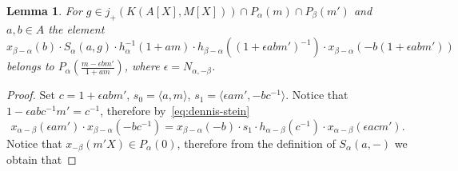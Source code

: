\documentclass[10pt,a4paper,twoside]{article}
\newtheorem{lemma}{Lemma}
\theoremstyle{remark}
\theoremstyle{definition}
\numberwithin{lemma}{section}
\numberwithin{prop}{section}
\numberwithin{corollary}{section}
\numberwithin{externaltheorem}{section}
\numberwithin{equation}{section}
\begin{document}
\begin{lemma} \label{SR:obtuse} For $g \in j_+(K(A[X], M[X])) \cap P_\alpha(m) \cap P_\beta(m')$ and $a, b\in A$ the element \[ x_{\beta - \alpha}(b) \cdot S_\alpha(a, g) \cdot h_{\alpha}^{-1}(1+am)\cdot h_{\beta - \alpha}((1 + \epsilon abm')^{-1})\cdot x_{\beta - \alpha}(-b(1 + \epsilon abm')) \]
 belongs to $P_\alpha\left(\tfrac{m - \epsilon bm'}{1+am}\right)$, where $\epsilon = N_{\alpha, -\beta}$.
\end{lemma}
\begin{proof} Set $c = 1 + \epsilon a b m'$, $s_0 = \langle a, m \rangle$, $s_1 = \langle \epsilon am', -bc^{-1} \rangle$.
Notice that $1 - \epsilon abc^{-1}m' = c^{-1}$, therefore by~\eqref{eq:dennis-stein}
\begin{equation} \label{eq:computation-SR-obtuse} x_{\alpha-\beta}(\epsilon am') \cdot x_{\beta-\alpha}(-bc^{-1}) = x_{\beta-\alpha}(-b) \cdot s_1 \cdot h_{\alpha-\beta}(c^{-1}) \cdot x_{\alpha-\beta}(\epsilon acm').\end{equation}
Notice that $x_{-\beta}(m'X) \in P_\alpha(0)$, therefore from the definition of $S_\alpha(a, -)$ we obtain that
\newline {}
\end{proof}
\end{document}

